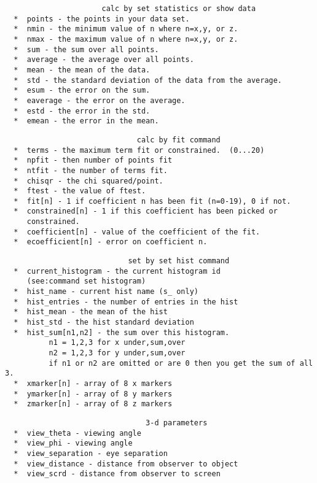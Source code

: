 \begin{verbatim}
                      calc by set statistics or show data
  *  points - the points in your data set.  
  *  nmin - the minimum value of n where n=x,y, or z.  
  *  nmax - the maximum value of n where n=x,y, or z.  
  *  sum - the sum over all points.  
  *  average - the average over all points.  
  *  mean - the mean of the data.  
  *  std - the standard deviation of the data from the average.  
  *  esum - the error on the sum.  
  *  eaverage - the error on the average.  
  *  estd - the error in the std.  
  *  emean - the error in the mean.  
\end{verbatim}

\begin{verbatim}
                              calc by fit command
  *  terms - the maximum term fit or constrained.  (0...20) 
  *  npfit - then number of points fit 
  *  ntfit - the number of terms fit.  
  *  chisqr - the chi squared/point.  
  *  ftest - the value of ftest.  
  *  fit[n] - 1 if coefficient n has been fit (n=0-19), 0 if not.  
  *  constrained[n] - 1 if this coefficient has been picked or
     constrained.  
  *  coefficient[n] - value of the coefficient of the fit.  
  *  ecoefficient[n] - error on coefficient n.  
\end{verbatim}

\begin{verbatim}
                            set by set hist command
  *  current_histogram - the current histogram id
     (see:command set histogram) 
  *  hist_name - current hist name (s_ only) 
  *  hist_entries - the number of entries in the hist 
  *  hist_mean - the mean of the hist 
  *  hist_std - the hist standard deviation 
  *  hist_sum[n1,n2] - the sum over this histogram.  
          n1 = 1,2,3 for x under,sum,over 
          n2 = 1,2,3 for y under,sum,over 
          if n1 or n2 are omitted or are 0 then you get the sum of all 3. 
  *  xmarker[n] - array of 8 x markers 
  *  ymarker[n] - array of 8 y markers 
  *  zmarker[n] - array of 8 z markers 
\end{verbatim}

\begin{verbatim}
                                3-d parameters
  *  view_theta - viewing angle 
  *  view_phi - viewing angle 
  *  view_separation - eye separation 
  *  view_distance - distance from observer to object 
  *  view_scrd - distance from observer to screen 
\end{verbatim}

